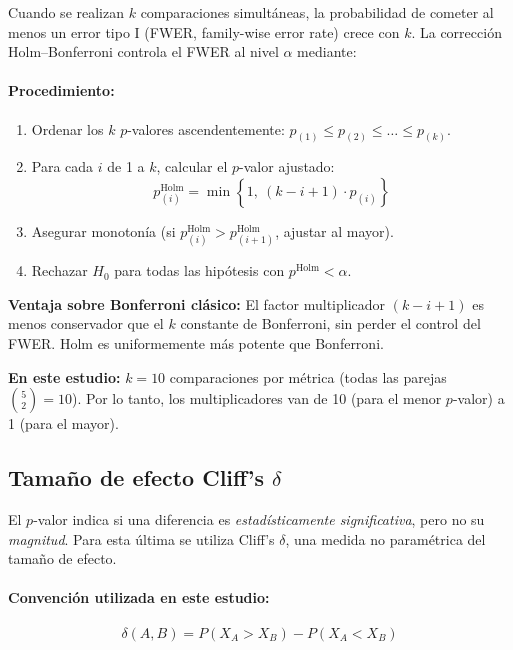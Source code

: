 \documentclass[12pt,a4paper,oneside]{book}
\begin{document}
Cuando se realizan $k$ comparaciones simultáneas, la probabilidad de cometer al menos un error tipo I (FWER, family-wise error rate) crece con $k$. La corrección Holm--Bonferroni controla el FWER al nivel $\alpha$ mediante:

\paragraph{Procedimiento:}
\begin{enumerate}
    \item Ordenar los $k$ $p$-valores ascendentemente: $p_{(1)} \leq p_{(2)} \leq \ldots \leq p_{(k)}$.
    \item Para cada $i$ de 1 a $k$, calcular el $p$-valor ajustado:
\begin{equation}
\boxed{p_{(i)}^{\text{Holm}} = \min\left\{1,\ (k - i + 1) \cdot p_{(i)}\right\}}
\end{equation}
    \item Asegurar monotonía (si $p_{(i)}^{\text{Holm}} > p_{(i+1)}^{\text{Holm}}$, ajustar al mayor).
    \item Rechazar $H_0$ para todas las hipótesis con $p^{\text{Holm}} < \alpha$.
\end{enumerate}

\textbf{Ventaja sobre Bonferroni clásico:} El factor multiplicador $(k-i+1)$ es menos conservador que el $k$ constante de Bonferroni, sin perder el control del FWER. Holm es uniformemente más potente que Bonferroni.

\textbf{En este estudio:} $k=10$ comparaciones por métrica (todas las parejas $\binom{5}{2}=10$). Por lo tanto, los multiplicadores van de 10 (para el menor $p$-valor) a 1 (para el mayor).

\subsection{Tamaño de efecto Cliff's $\delta$}

El $p$-valor indica si una diferencia es \emph{estadísticamente significativa}, pero no su \emph{magnitud}. Para esta última se utiliza Cliff's $\delta$, una medida no paramétrica del tamaño de efecto.

\paragraph{Convención utilizada en este estudio:}
\begin{equation}
\boxed{\delta(A,B) = P(X_A > X_B) - P(X_A < X_B)}
\label{doc3:eq:cliff}
\end{equation}
\end{document}
